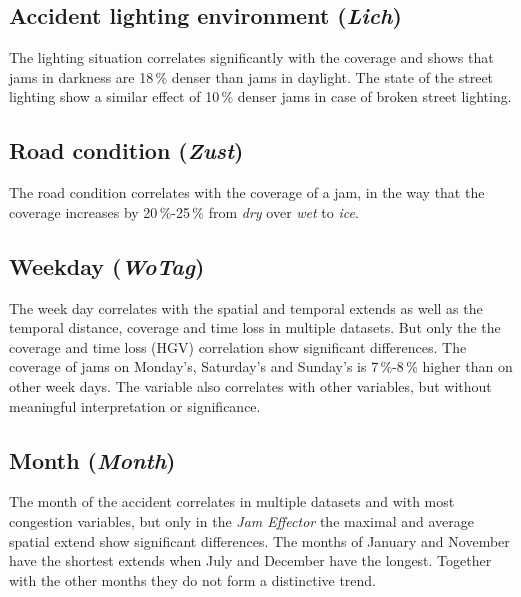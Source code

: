 \subsection{Accident lighting environment (\textit{Lich})}
\label{analysis_sum_Lich}
The lighting situation correlates significantly with the coverage and shows that jams in darkness are 18\,\% denser than jams in daylight. The state of the street lighting show a similar effect of 10\,\% denser jams in case of broken street lighting.

\subsection{Road condition (\textit{Zust})}
\label{analysis_sum_Zust}
The road condition correlates with the coverage of a jam, in the way that the coverage increases by 20\,\%-25\,\% from \textit{dry} over \textit{wet} to \textit{ice}.

\subsection{Weekday (\textit{WoTag})}
\label{analysis_sum_WoTag}
The week day correlates with the spatial and temporal extends as well as the temporal distance, coverage and time loss in multiple datasets. But only the the coverage and time loss (HGV) correlation show significant differences. The coverage of jams on Monday's, Saturday's and Sunday's is 7\,\%-8\,\% higher than on other week days. The variable also correlates with other variables, but without meaningful interpretation or significance.

\subsection{Month (\textit{Month})}
\label{analysis_sum_Month}
The month of the accident correlates in multiple datasets and with most congestion variables, but only in the \textit{Jam Effector} the maximal and average spatial extend show significant differences. The months of January and November have the shortest extends when July and December have the longest. Together with the other months they do not form a distinctive trend. 

